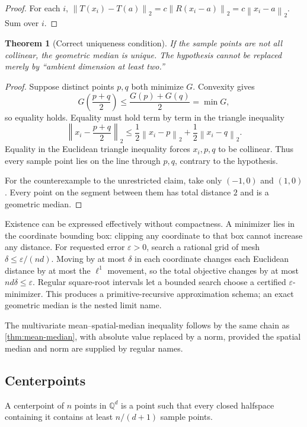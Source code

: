 \documentclass[11pt]{article}
\newtheorem{theorem}{Theorem}[section]
\newcommand{\Rat}{\mathbb Q}
\newcommand{\norm}[1]{\left\lVert#1\right\rVert}
\begin{document}
\begin{proof}
For each $i$,
$\norm{T(x_i)-T(a)}_2=c\norm{R(x_i-a)}_2=c\norm{x_i-a}_2$.  Sum over $i$.
\end{proof}

\begin{theorem}[Correct uniqueness condition]\label{thm:geom-unique}
If the sample points are not all collinear, the geometric median is unique.
The hypothesis cannot be replaced merely by ``ambient dimension at least
two.''
\end{theorem}

\begin{proof}
Suppose distinct points $p,q$ both minimize $G$.  Convexity gives
\[
 G\left(\frac{p+q}{2}\right)
 \leq\frac{G(p)+G(q)}2=\min G,
\]
so equality holds.  Equality must hold term by term in the triangle
inequality
\[
 \norm{x_i-\frac{p+q}{2}}_2
 \leq\frac12\norm{x_i-p}_2+\frac12\norm{x_i-q}_2.
\]
Equality in the Euclidean triangle inequality forces $x_i,p,q$ to be
collinear.  Thus every sample point lies on the line through $p,q$, contrary
to the hypothesis.

For the counterexample to the unrestricted claim, take only
$(-1,0)$ and $(1,0)$.  Every point on the segment between them has total
distance $2$ and is a geometric median.
\end{proof}

Existence can be expressed effectively without compactness.  A minimizer lies
in the coordinate bounding box: clipping any coordinate to that box cannot
increase any distance.  For requested error $\varepsilon>0$, search a rational
grid of mesh $\delta\leq\varepsilon/(nd)$.  Moving by at most $\delta$ in each
coordinate changes each Euclidean distance by at most the $\ell^1$ movement,
so the total objective changes by at most $nd\delta\leq\varepsilon$.
Regular square-root intervals let a bounded search choose a certified
$\varepsilon$-minimizer.  This produces a primitive-recursive approximation
schema; an exact geometric median is the nested limit name.

The multivariate mean--spatial-median inequality follows by the same chain as
\cref{thm:mean-median}, with absolute value replaced by a norm, provided the
spatial median and norm are supplied by regular names.

\subsection{Centerpoints}

A centerpoint of $n$ points in $\Rat^d$ is a point such that every closed
halfspace containing it contains at least $n/(d+1)$ sample points.
\end{document}
